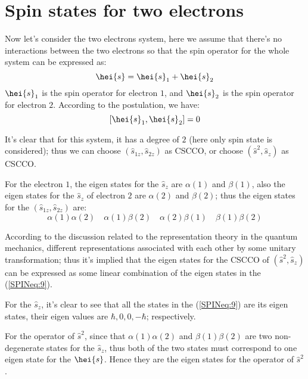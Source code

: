 \section{Spin states for two electrons}
%
%
Now let's consider the two electrons system, here we assume that
there's no interactions between the two electrons so that the spin
operator for the whole system can be expressed as:
\begin{equation}\label{}
\hei{s} = \hei{s}_{1} + \hei{s}_{2}
\end{equation}
$\hei{s}_{1}$ is the spin operator for electron $1$, and
$\hei{s}_{2}$ is the spin operator for electron $2$. According to
the postulation, we have:
\begin{equation}\label{}
[\hei{s}_{1}, \hei{s}_{2}] = 0
\end{equation}

It's clear that for this system, it has a degree of $2$ (here only
spin state is considered); thus we can choose $(\hat{s}_{1z},
\hat{s}_{2z})$ as CSCCO, or choose $(\hat{s}^{2}, \hat{s}_{z})$ as
CSCCO.

For the electron $1$, the eigen states for the $\hat{s}_{z}$ are
$\alpha(1)$ and $\beta(1)$, also the eigen states for the
$\hat{s}_{z}$ of electron $2$ are $\alpha(2)$ and $\beta(2)$; thus
the eigen states for the $(\hat{s}_{1z}, \hat{s}_{2z})$ are:
\begin{equation}\label{SPINeq:9}
\alpha(1)\alpha(2) \quad \alpha(1)\beta(2) \quad \alpha(2)\beta(1)
\quad \beta(1)\beta(2)
\end{equation}

According to the discussion related to the representation theory in
the quantum mechanics, different representations associated with
each other by some unitary transformation; thus it's implied that
the eigen states for the CSCCO of $(\hat{s}^{2}, \hat{s}_{z})$ can
be expressed as some linear combination of the eigen states in the
(\ref{SPINeq:9}).

For the $\hat{s}_{z}$, it's clear to see that all the states in the
(\ref{SPINeq:9}) are its eigen states, their eigen values are
$\hbar, 0, 0, -\hbar$; respectively.

For the operator of $\hat{s}^{2}$, since that $\alpha(1)\alpha(2)$
and $\beta(1)\beta(2)$ are two non-degenerate states for the
$\hat{s}_{z}$, thus both of the two states must correspond to one
eigen state for the $\hei{s}$. Hence they are the eigen states for
the operator of $\hat{s}^{2}$.

